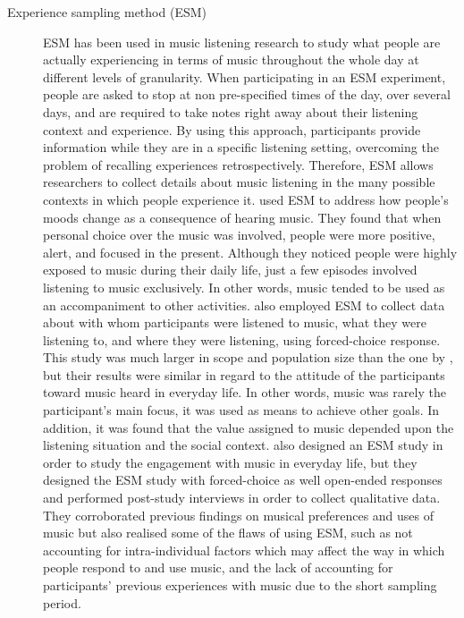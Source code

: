 \begin{description}
	\item[Experience sampling method (ESM)] ESM has been used in music listening research to study what people are actually experiencing in terms of music throughout the whole day at different levels of granularity. When participating in an ESM experiment, people are asked to stop at non pre-specified times of the day, over several days, and are required to take notes right away about their listening context and experience.  By using this approach, participants provide information while they are in a specific listening setting, overcoming the problem of recalling experiences retrospectively. Therefore, ESM allows researchers to collect details about music listening in the many possible contexts in which people experience it. 
	\textcite{sloboda01functions} used ESM to address how people's moods change as a consequence of hearing music. They found that when personal choice over the music was involved, people were more positive, alert, and focused in the present. Although they noticed people were highly exposed to music during their daily life, just a few episodes involved listening to music exclusively. In other words, music tended to be used as an accompaniment to other activities. 
	\textcite{north04uses} also employed ESM to collect data about with whom participants were listened to music, what they were listening to, and where they were listening, using forced-choice response. This study was much larger in scope and  population size than the one by \citeauthor{sloboda01functions}, but their results were similar in regard to the attitude of the participants toward music heard in everyday life. In other words, music was rarely the participant's main focus, it was used as means to achieve other goals. In addition, it was found that the value assigned to music depended upon the listening situation and the social context.
    \textcite{greasley11exploring} also designed an ESM study in order to study the engagement with music in everyday life, but they designed the ESM study with forced-choice as well open-ended responses and performed post-study interviews in order to collect qualitative data. They corroborated previous findings on musical preferences and uses of music but also realised some of the flaws of using ESM, such as not accounting for intra-individual factors which may affect the way in which people respond to and use music, and the lack of accounting for participants' previous experiences with music due to the short sampling period.
\end{description}

